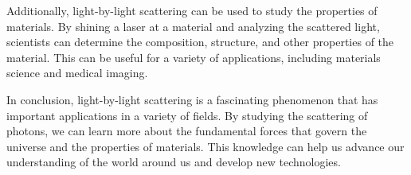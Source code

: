 \documentclass{paper}
\begin{document}
Additionally, light-by-light scattering can be used to study the properties of materials. By shining a laser at a material and analyzing the scattered light, scientists can determine the composition, structure, and other properties of the material. This can be useful for a variety of applications, including materials science and medical imaging.

In conclusion, light-by-light scattering is a fascinating phenomenon that has important applications in a variety of fields. By studying the scattering of photons, we can learn more about the fundamental forces that govern the universe and the properties of materials. This knowledge can help us advance our understanding of the world around us and develop new technologies.

\newpage
\nocite{*}
\printbibliography
\end{document}
